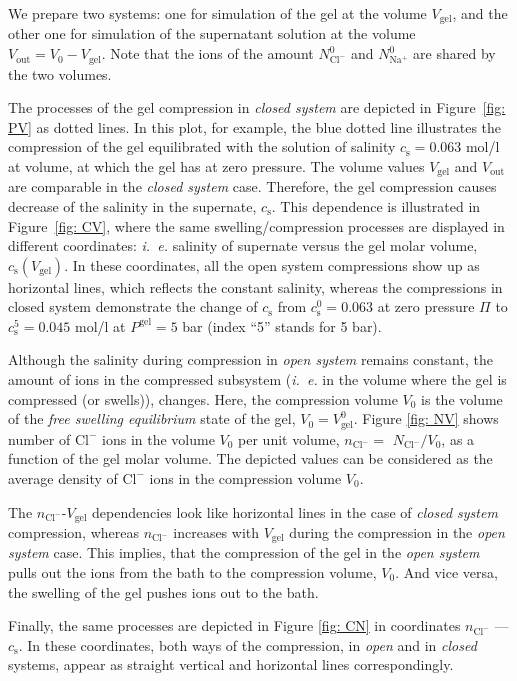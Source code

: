 \documentclass[journal,article,submit,pdftex,moreauthors]{Definitions/mdpi}
\newcommand{\ie}{\textit{i.~e.} }
\newcommand{\ncl}{n_\mathrm{Cl^-}}
\newcommand{\Nna}{N_\mathrm{Na^+}}
\newcommand{\Ncl}{N_\mathrm{Cl^-}}
\newcommand{\gel}{^\mathrm{gel}}
\newcommand{\cl}{\mathrm{Cl^-}}
\newcommand{\cs}{c_{\mathrm{s}}}
\newcommand{\Vgel}{V_\mathrm{gel}}
\newcommand{\Pgel}{\Pi}
\newcommand{\Vout}{V_\mathrm{out}}
\newcommand{\Vbox}{V_0}
\newcommand{\reffig}[1]{Figure~\ref{#1}}
\begin{document}
We prepare two systems: one for simulation of the gel at the volume $\Vgel$,
and the other one for simulation of the supernatant solution at the volume $\Vout = \Vbox - \Vgel$.
Note that the ions of the amount $\Ncl^0$ and $\Nna^0$ are shared by the two volumes. 

The processes of the gel compression in \emph{closed system} are depicted in Figure~\ref{fig: PV} as dotted lines.
In this plot, for example, the blue dotted line illustrates the compression of the gel equilibrated with the solution of salinity $\cs=0.063$ mol/l at volume, at which the gel has at zero pressure. 
The volume values $\Vgel$ and $\Vout$ are comparable in the \emph{closed system} case.
Therefore, the gel compression causes decrease of the salinity in the supernate, $\cs$. 
This dependence is illustrated in \reffig{fig: CV}, where the same swelling/compression processes are displayed in different coordinates: \ie salinity of supernate versus the gel molar volume, $\cs(\Vgel)$.
In these coordinates, all the open system compressions show up as horizontal lines, which reflects the constant salinity, whereas the compressions in closed system demonstrate the change of $\cs$ from $\cs^{0}=0.063$ at zero pressure $\Pgel$ to $\cs^{5}=0.045$ mol/l at $P\gel=5$ bar (index ``5'' stands for 5 bar). 

Although the salinity during compression in \emph{open system} remains constant, the amount of ions in the compressed subsystem (\ie in the volume where the gel is compressed (or swells)), changes.
Here, the compression volume $\Vbox$ is the volume of the \emph{free swelling equilibrium} state of the gel, $\Vbox = \Vgel^0$.
Figure \ref{fig: NV} shows number of $\cl$ ions in the volume $\Vbox$ per unit volume, $\ncl =$ $\Ncl/\Vbox$, as a function of the gel molar volume. 
The depicted values can be considered as the average density of $\cl$ ions in the compression volume $\Vbox$. 

The $\ncl$-$\Vgel$ dependencies look like horizontal lines in the case of \emph{closed system} compression,
whereas $\ncl$ increases with $\Vgel$ during the compression in the \emph{open system} case. 
This implies, that the compression of the gel in the \emph{open system} pulls out the ions from the bath to the compression volume, $\Vbox$. 
And vice versa, the swelling of the gel pushes ions out to the bath.

Finally, the same processes are depicted in Figure \ref{fig: CN} in coordinates $\ncl$ --- $\cs$. 
In these coordinates, both ways of the compression, in \emph{open} and in \emph{closed} systems, appear as straight vertical and horizontal lines correspondingly. 
\end{document}
